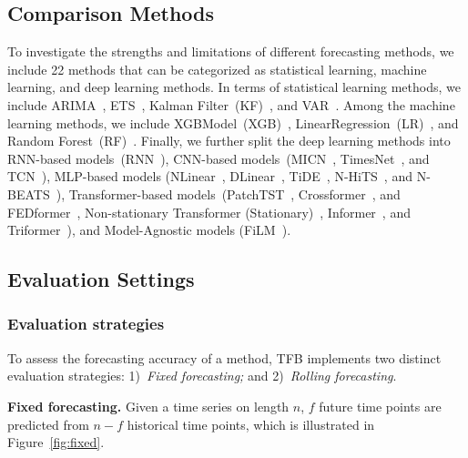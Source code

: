 \documentclass[sigconf, nonacm, pdfa]{acmart}
\begin{document}
\subsection{Comparison Methods}
\label{sec:Baselines}
To investigate the strengths and limitations of different forecasting methods, we include 22 methods that can be categorized as statistical learning, machine learning, and deep learning methods. In terms of statistical learning methods, we include ARIMA~\cite{box1970distribution}, ETS~\cite{hyndman2008forecasting}, Kalman Filter~(KF)~\cite{harvey1990forecasting}, and VAR~\cite{toda1994vector}. Among the machine learning methods, we include XGBModel~(XGB)~\cite{herzen2022darts}, LinearRegression~(LR)~\cite{kedem2005regression, herzen2022darts}, and Random Forest~(RF)~\cite{breiman2001random}. 
Finally, we further split the deep learning methods into RNN-based models~(RNN~\cite{kim2021reversible}), CNN-based models~(MICN~\cite{wang2022micn}, TimesNet~\cite{wu2022timesnet}, and TCN~\cite{bai2018empirical}), MLP-based models (NLinear~\cite{zeng2023transformers}, DLinear~\cite{zeng2023transformers}, TiDE~\cite{das2023long}, N-HiTS~\cite{challu2023nhits}, and N-BEATS~\cite{oreshkin2019n}), Transformer-based models~(PatchTST~\cite{nie2022time}, Crossformer~\cite{zhang2022crossformer}, and FEDformer~\cite{zhou2022fedformer}, Non-stationary Transformer (Stationary)~\cite{liu2022non}, Informer~\cite{zhou2021informer}, and Triformer~\cite{cirstea2022triformer}), and Model-Agnostic models (FiLM~\cite{zhou2022FiLM}). 


\subsection{Evaluation Settings}
\label{sec:Evaluation Settings}






\subsubsection{Evaluation strategies}
To assess the forecasting accuracy of a method, TFB implements two distinct evaluation strategies: 1)~\textit{Fixed forecasting;} and 2)~\textit{Rolling forecasting}.


\noindent
\textbf{Fixed forecasting. }Given a time series on length $n$, $f$ future time points are predicted from $n - f$ historical time points, which is illustrated in Figure~\ref{fig:fixed}. 
\end{document}
